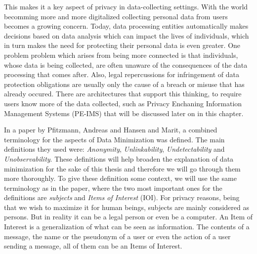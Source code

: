 
This makes it a key aspect of privacy in data-collecting settings. With the world becomming more and more digitalized collecting personal data from users becomes a growing concern. Today, data processing entities automatically makes decisions based on data analysis which can impact the lives of individuals, which in turn makes the need for protecting their personal data is even greater.\cite{danezis2015privacy} One problem problem which arises from being more connected is that individuals, whose data is being collected, are often unaware of the consequences of the data processing that comes after. Also, legal repercussions for infringement of data protection obligations are usually only the cause of a breach or misuse that has already occured. There are architectures that support this thinking, to require users know more of the data collected, such as Privacy Enchaning Information Management Systems (PE-IMS) that will be discussed later on in this chapter. 









In a paper by Pfitzmann, Andreas and Hansen and Marit, a combined terminology for the aspects of Data Minimization was defined. The main definitions they used were: \textit{Anonymity}, \textit{Unlinkability}, \textit{Undetectability} and \textit{Unobservability}.\cite{pfitzmann2010terminology} These definitions will help broaden the explanation of data minimization for the sake of this thesis and therefore we will go through them more thoroughly. To give these definition some context, we will use the same terminology as in the paper, where the two most important ones for the definitions are \textit{subjects} and \textit{Items of Interest} (IOI). For privacy reasons, being that we wish to maximize it for human beings, subjects are mainly considered as persons. But in reality it can be a legal person or even be a computer. An Item of Interest is a generalization of what can be seen as information. The contents of a message, the name or the pseudonym of a user or even the action of a user sending a message, all of them can be an Items of Interest.


